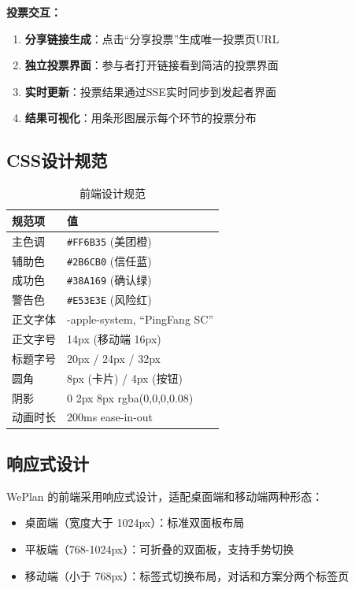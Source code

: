 \documentclass[12pt,a4paper]{ctexart}
\begin{document}
\textbf{投票交互：}
\begin{enumerate}
\item \textbf{分享链接生成}：点击``分享投票''生成唯一投票页URL
\item \textbf{独立投票界面}：参与者打开链接看到简洁的投票界面
\item \textbf{实时更新}：投票结果通过SSE实时同步到发起者界面
\item \textbf{结果可视化}：用条形图展示每个环节的投票分布
\end{enumerate}

\subsection{CSS设计规范}

\begin{table}[H]
\centering
\caption{前端设计规范}
\label{tab:design-spec}
\renewcommand{\arraystretch}{1.3}
\begin{tabularx}{\textwidth}{lX}
\toprule
\textbf{规范项} & \textbf{值} \\
\midrule
主色调 & \texttt{\#FF6B35} (美团橙) \\
辅助色 & \texttt{\#2B6CB0} (信任蓝) \\
成功色 & \texttt{\#38A169} (确认绿) \\
警告色 & \texttt{\#E53E3E} (风险红) \\
正文字体 & -apple-system, ``PingFang SC'' \\
正文字号 & 14px (移动端 16px) \\
标题字号 & 20px / 24px / 32px \\
圆角 & 8px (卡片) / 4px (按钮) \\
阴影 & 0 2px 8px rgba(0,0,0,0.08) \\
动画时长 & 200ms ease-in-out \\
\bottomrule
\end{tabularx}
\end{table}

\subsection{响应式设计}

WePlan 的前端采用响应式设计，适配桌面端和移动端两种形态：

\begin{itemize}[leftmargin=2em]
  \item 桌面端（宽度大于 1024px）：标准双面板布局
  \item 平板端（768-1024px）：可折叠的双面板，支持手势切换
  \item 移动端（小于 768px）：标签式切换布局，对话和方案分两个标签页
\end{itemize}
\end{document}
